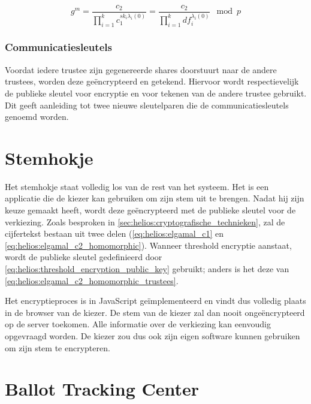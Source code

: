 \begin{equation}
  \label{eq:helios:threshold_encryption_m}
  g^m = \frac{c_2}{\prod_{i=1}^k{c_1^{{sk}_i\lambda_i(0)}}} = \frac{c_2}{\prod_{i=1}^k{{df}_i^{\lambda_i(0)}}} \mod{p}
\end{equation}


\subsubsection{Communicatiesleutels}
\label{sec:helios:communicatiesleutels}

Voordat iedere trustee zijn gegenereerde shares doorstuurt naar de andere trustees, worden deze ge\"encrypteerd en getekend. Hiervoor wordt respectievelijk de publieke sleutel voor encryptie en voor tekenen van de andere trustee gebruikt. Dit geeft aanleiding tot twee nieuwe sleutelparen die de communicatiesleutels genoemd worden.

\section{Stemhokje}
\label{sec:helios:stemhokje}

Het stemhokje staat volledig los van de rest van het systeem. Het is een applicatie die de kiezer kan gebruiken om zijn stem uit te brengen. Nadat hij zijn keuze gemaakt heeft, wordt deze ge\"encrypteerd met de publieke sleutel voor de verkiezing. Zoals besproken in \ref{sec:helios:cryptografische_technieken}, zal de cijfertekst bestaan uit twee delen (\ref{eq:helios:elgamal_c1} en \ref{eq:helios:elgamal_c2_homomorphic}). Wanneer threshold encryptie aanstaat, wordt de publieke sleutel gedefinieerd door \ref{eq:helios:threshold_encryption_public_key} gebruikt; anders is het deze van \ref{eq:helios:elgamal_c2_homomorphic_trustees}.

\npar Het encryptieproces is in JavaScript ge\"implementeerd en vindt dus volledig plaats in de browser van de kiezer. De stem van de kiezer zal dan nooit onge\"encrypteerd op de server toekomen. Alle informatie over de verkiezing kan eenvoudig opgevraagd worden. De kiezer zou dus ook zijn eigen software kunnen gebruiken om zijn stem te encrypteren.

\section{Ballot Tracking Center}
\label{sec:helios:ballot_tracking_center}

